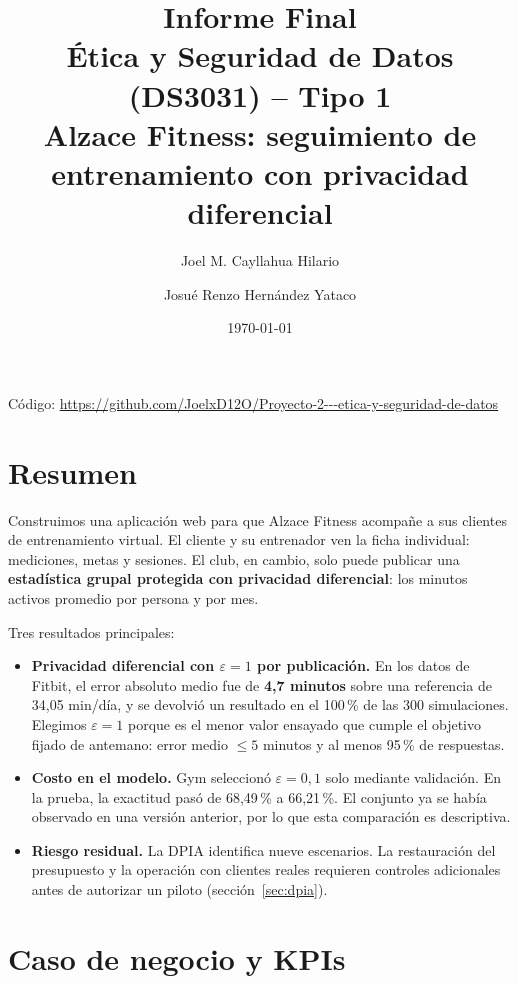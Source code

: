 \documentclass[11pt]{article}
\title{\textbf{Informe Final \\ Ética y Seguridad de Datos (DS3031) -- Tipo 1}\\
\large Alzace Fitness: seguimiento de entrenamiento con privacidad diferencial}
\author{Joel M. Cayllahua Hilario \and Josué Renzo Hernández Yataco}
\date{\today}
\begin{document}
\maketitle

\begin{center}
\small Código: \url{https://github.com/JoelxD12O/Proyecto-2---etica-y-seguridad-de-datos}
\end{center}

\setcounter{tocdepth}{1}
\tableofcontents
\newpage

\section{Resumen}

Construimos una aplicación web para que Alzace Fitness acompañe a sus clientes de entrenamiento virtual. El cliente y su entrenador ven la ficha individual: mediciones, metas y sesiones. El club, en cambio, solo puede publicar una \textbf{estadística grupal protegida con privacidad diferencial}: los minutos activos promedio por persona y por mes.

Tres resultados principales:
\begin{itemize}[nosep]
  \item \textbf{Privacidad diferencial con $\varepsilon = 1$ por publicación.} En los datos de Fitbit, el error absoluto medio fue de \textbf{4,7 minutos} sobre una referencia de 34,05 min/día, y se devolvió un resultado en el 100\,\% de las 300 simulaciones. Elegimos $\varepsilon = 1$ porque es el menor valor ensayado que cumple el objetivo fijado de antemano: error medio $\le 5$ minutos y al menos 95\,\% de respuestas.
  \item \textbf{Costo en el modelo.} Gym seleccionó $\varepsilon=0{,}1$ solo mediante validación. En la prueba, la exactitud pasó de 68,49\,\% a 66,21\,\%. El conjunto ya se había observado en una versión anterior, por lo que esta comparación es descriptiva.
  \item \textbf{Riesgo residual.} La DPIA identifica nueve escenarios. La restauración del presupuesto y la operación con clientes reales requieren controles adicionales antes de autorizar un piloto (sección~\ref{sec:dpia}).
\end{itemize}

\section{Caso de negocio y KPIs}
\end{document}
